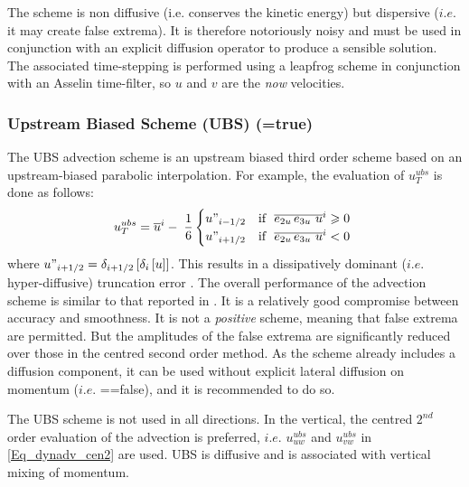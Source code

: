 The scheme is non diffusive (i.e. conserves the kinetic energy) but dispersive 
($i.e.$ it may create false extrema). It is therefore notoriously noisy and must be 
used in conjunction with an explicit diffusion operator to produce a sensible solution. 
The associated time-stepping is performed using a leapfrog scheme in conjunction 
with an Asselin time-filter, so $u$ and $v$ are the \emph{now} velocities.

\subsubsection{Upstream Biased Scheme (UBS) (=true)}
\label{DYN_adv_ubs}

The UBS advection scheme is an upstream biased third order scheme based on 
an upstream-biased parabolic interpolation. For example, the evaluation of 
$u_T^{ubs} $ is done as follows:
\begin{equation} \label{Eq_dynadv_ubs}
u_T^{ubs} =\overline u ^i-\;\frac{1}{6} 	\begin{cases}
		u"_{i-1/2}& 	\text{if $\ \overline{e_{2u}\,e_{3u} \ u}^i  \geqslant 0$ } 	\\
		u"_{i+1/2}& 	\text{if $\ \overline{e_{2u}\,e_{3u} \ u}^i  < 0$ }
\end{cases}
\end{equation}
where $u"_{i+1/2} =\delta _{i+1/2} \left[ {\delta _i \left[ u \right]} \right]$. This results 
in a dissipatively dominant ($i.e.$ hyper-diffusive) truncation error \citep{Shchepetkin_McWilliams_OM05}. 
The overall performance of the advection scheme is similar to that reported in 
\citet{Farrow1995}. It is a relatively good compromise between accuracy and 
smoothness. It is not a \emph{positive} scheme, meaning that false extrema are 
permitted. But the amplitudes of the false extrema are significantly reduced over 
those in the centred second order method. As the scheme already includes 
a diffusion component, it can be used without explicit  lateral diffusion on momentum 
($i.e.$ ==false), and it is recommended to do so.

The UBS scheme is not used in all directions. In the vertical, the centred $2^{nd}$ 
order evaluation of the advection is preferred, $i.e.$ $u_{uw}^{ubs}$ and 
$u_{vw}^{ubs}$ in \eqref{Eq_dynadv_cen2} are used. UBS is diffusive and is 
associated with vertical mixing of momentum. 

